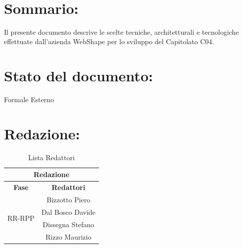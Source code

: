 \begin{center} %
	\begin{Huge}	
				\textbf{\TITOLODOC}
			\\
	\end{Huge}
\end{center}

\section*{\LARGE Sommario:}
Il presente documento descrive le scelte tecniche, architetturali e tecnologiche effettuate dall'azienda WebShape per lo sviluppo del Capitolato C04.

\indent \indent

\section*{\LARGE Stato del documento:}
\indent \indent
	Formale Esterno

\section*{\LARGE Redazione:}
	\begin{table}[!h]
		\begin{center}
			\begin{tabular}
				{|c|c|}
				\hline
				\multicolumn{2}{|c|}{ \textbf{Redazione} } \\
				\hline
				\textbf{Fase} & \textbf{Redattori} \\
				\hline
				\multirow{4}{*}{RR-RPP} & Bizzotto Piero\\
										& Dal Bosco Davide\\
										& Dissegna Stefano\\
										& Rizzo Maurizio\\
				\hline
			\end{tabular}
			\caption{Lista Redattori} %
			\label{tabredazione}
		\end{center}
	\end{table}

